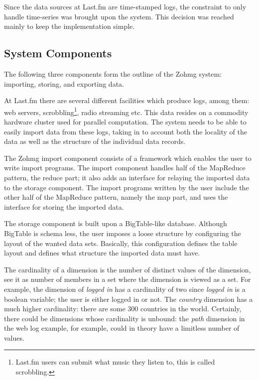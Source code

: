 Since the data sources at Last.fm are time-stamped logs, the constraint to only
handle time-series was brought upon the system. This decision was reached
mainly to keep the implementation simple.


\subsection*{System Components}

The following three components form the outline of the Zohmg system: importing,
storing, and exporting data.

At Last.fm there are several different facilities which produce logs, among
them: web servers, scrobbling\footnote{Last.fm users can submit what music they
listen to, this is called scrobbling.}, radio streaming etc. This data resides
on a commodity hardware cluster used for parallel computation. The system needs to
be able to easily import data from these logs, taking in to account both the
locality of the data as well as the structure of the individual data records.

The Zohmg import component consists of a framework which enables the user to
write import programs. The import component handles half of the MapReduce
pattern, the reduce part; it also adds an interface for relaying the imported
data to the storage component. The import programs written by the user include
the other half of the MapReduce pattern, namely the map part, and uses the
interface for storing the imported data.

The storage component is built upon a BigTable-like database. Although BigTable
is schema less, the user imposes a loose structure by configuring the layout of
the wanted data sets. Basically, this configuration defines the table layout and
defines what structure the imported data must have.

The cardinality of a dimension is the number of distinct values of the
dimension, see it as number of members in a set where the dimension is
viewed as a set. For example, the dimension of \textit{logged in} has a
cardinality of two since \textit{logged in} is a boolean variable; the user
is either logged in or not. The \textit{country} dimension has a much
higher cardinality: there are some 300 countries in the world. Certainly,
there could be dimensions whose cardinality is unbound: the \textit{path}
dimension in the web log example, for example, could in theory have a
limitless number of values.

